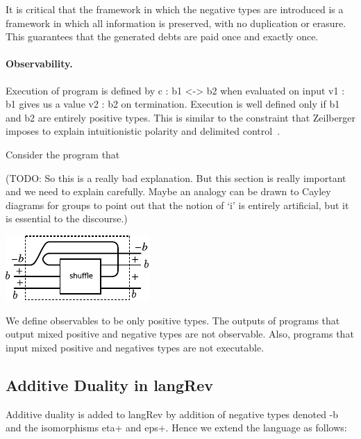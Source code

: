 \documentclass[preprint]{sigplanconf}
\begin{document}
{It is critical that the framework in which the negative types are introduced
is a framework in which all information is preserved, with no duplication or
erasure. This guarantees that the generated debts are paid once and exactly
once.

\paragraph*{Observability.} 
Execution of program is defined by {{c : b1 <-> b2}} when evaluated on input
{{v1 : b1}} gives us a value {{v2 : b2}} on termination. Execution is well
defined only if {{b1}} and {{b2}} are entirely positive types. This is
similar to the constraint that Zeilberger imposes to explain intuitionistic
polarity and delimited control~\cite{10.1109/LICS.2010.23}.

Consider the program that

(TODO: So this is a really bad explanation. But this section is really
important and we need to explain carefully. Maybe an analogy can be
drawn to Cayley diagrams for groups to point out that the notion of
`i' is entirely artificial, but it is essential to the discourse.)

\begin{center}
  \includegraphics{diagrams/shuffle.pdf}
\end{center}

We define observables to be only positive types. The outputs of
programs that output mixed positive and negative types are not
observable.  Also, programs that input mixed positive and negatives
types are not executable.

\subsection{Additive Duality in {{langRev}} }

Additive duality is added to {{langRev}} by addition of negative types
denoted {{-b}} and the isomorphisms {{eta+}} and {{eps+}}. Hence we
extend the language as follows:

%

}
\end{document}
